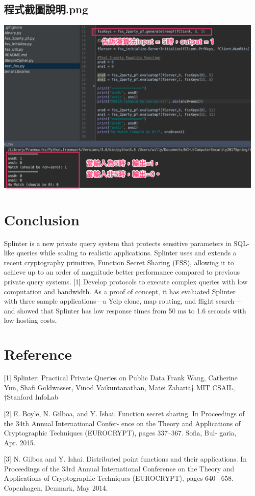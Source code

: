 \documentclass[12pt,a4paper]{article}
\begin{document}
\begin{multicols}{2}
\subsection{程式截圖說明.png}
\includegraphics[scale=0.25]{程式截圖說明.png}


\section{Conclusion}
Splinter is a new private query system that protects sensitive parameters in SQL-like queries while scaling to realistic applications. Splinter uses and extends a recent cryptography primitive, Function Secret Sharing (FSS), allowing it to achieve up to an order of magnitude better performance compared to previous private query systems. [1] Develop protocols to execute complex queries with low computation and bandwidth. As a proof of concept, it has evaluated Splinter with three sample applications—a Yelp clone, map routing, and flight search—and showed that Splinter has low response times from 50 ms to 1.6 seconds with low hosting costs.

\section{Reference}
[1] Splinter: Practical Private Queries on Public 
Data Frank Wang, Catherine Yun, Shafi Goldwasser, 
Vinod Vaikuntanathan, Matei Zaharia† MIT CSAIL, 
†Stanford InfoLab

[2] E. Boyle, N. Gilboa, and Y. Ishai. Function 
secret sharing. In Proceedings of the 34th Annual 
International Confer- ence on the Theory and 
Applications of Cryptographic Techniques 
(EUROCRYPT), pages 337–367. Sofia, Bul- garia, Apr. 
2015.

[3] N. Gilboa and Y. Ishai. Distributed point 
functions and their applications. In Proceedings of 
the 33rd Annual International Conference on the 
Theory and Applications of Cryptographic Techniques 
(EUROCRYPT), pages 640– 658. Copenhagen, Denmark, 
May 2014.
\end{multicols}
\end{document}
